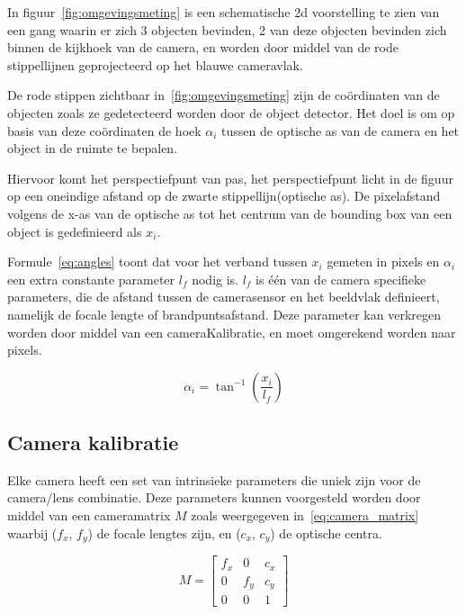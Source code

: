 In figuur~\ref{fig:omgevingsmeting} is een schematische 2d voorstelling te zien van een gang waarin er zich 3 objecten bevinden, 2 van deze objecten bevinden zich
binnen de kijkhoek van de camera, en worden door middel van de rode stippellijnen geprojecteerd op het blauwe cameravlak.

De rode stippen zichtbaar in~\ref{fig:omgevingsmeting} zijn de co\"{o}rdinaten van de objecten zoals ze gedetecteerd worden door de object detector.
Het doel is om op basis van deze co\"{o}rdinaten de hoek $\alpha_i$ tussen de optische as van de camera en het object in de ruimte te bepalen.

Hiervoor komt het perspectiefpunt van pas, het perspectiefpunt licht in de figuur op een oneindige afstand op de zwarte stippellijn(optische as).
De pixelafstand volgens de x-as van de optische as tot het centrum van de bounding box van een object is gedefinieerd als $x_i$.

Formule~\ref{eq:angles} toont dat voor het verband tussen $x_i$ gemeten in pixels en $\alpha_i$ een extra constante parameter $l_f$ nodig is.
$l_f$ is \'{e}\'{e}n van de camera specifieke parameters, die de afstand tussen de camerasensor en het beeldvlak definieert, namelijk de focale lengte of brandpuntsafstand.
Deze parameter kan verkregen worden door middel van een cameraKalibratie, en moet omgerekend worden naar pixels.

\begin{equation}
    \alpha_i = \tan^{-1}(\frac{x_i}{l_f})
    \label{eq:angles}
\end{equation}


\subsection{Camera kalibratie}
Elke camera heeft een set van intrinsieke parameters die uniek zijn voor de camera/lens combinatie.
Deze parameters kunnen voorgesteld worden door middel van een cameramatrix $M$ zoals weergegeven in~\ref{eq:camera_matrix} waarbij ($f_x$, $f_y$) de focale lengtes zijn, en ($c_x$, $c_y$) de optische centra.

\begin{equation}
    M = \begin{bmatrix}
            f_x &  0  & c_x \\
            0   & f_y & c_y \\
            0   &  0  &  1
    \end{bmatrix}
    \label{eq:camera_matrix}
\end{equation}

